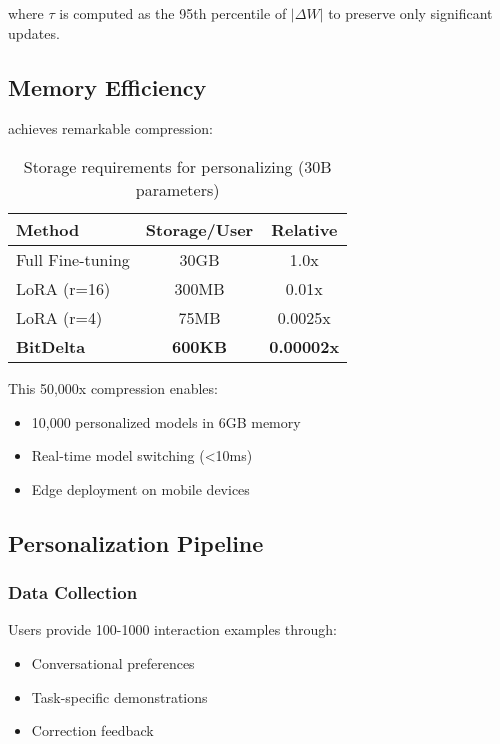 where $\tau$ is computed as the 95th percentile of $|\Delta W|$ to preserve only significant updates.

\subsection{Memory Efficiency}

\bitdelta{} achieves remarkable compression:

\begin{table}[h]
\centering
\begin{tabular}{lcc}
\toprule
\textbf{Method} & \textbf{Storage/User} & \textbf{Relative} \\
\midrule
Full Fine-tuning & 30GB & 1.0x \\
LoRA (r=16) & 300MB & 0.01x \\
LoRA (r=4) & 75MB & 0.0025x \\
\textbf{BitDelta} & \textbf{600KB} & \textbf{0.00002x} \\
\bottomrule
\end{tabular}
\caption{Storage requirements for personalizing \zen{} (30B parameters)}
\end{table}

This 50,000x compression enables:
\begin{itemize}
    \item 10,000 personalized models in 6GB memory
    \item Real-time model switching (<10ms)
    \item Edge deployment on mobile devices
\end{itemize}

\subsection{Personalization Pipeline}

\subsubsection{Data Collection}
Users provide 100-1000 interaction examples through:
\begin{itemize}
    \item Conversational preferences
    \item Task-specific demonstrations
    \item Correction feedback
\end{itemize}

